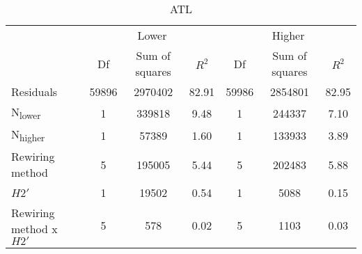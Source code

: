 \documentclass[12pt,a4paper]{article}
\begin{document}
\begin{table}
\medskip
    \begin{subtable}{\linewidth}
    \caption{ATL}
    \centering
\begin{tabularx}{\linewidth}{@{} X *6{c} @{}}
\toprule
  & \multicolumn{3}{c}{Lower} & \multicolumn{3}{c}{Higher} \\ \cmidrule(l){2-4} \cmidrule(l){5-7}
  						& Df		& Sum of squares	& $R^2$	& Df 	& Sum of squares	& $R^2$ \\ \midrule
Residuals 				& 59896 & 2970402		& 82.91	& 59986 & 2854801			& 82.95   \\
N\textsubscript{lower} 	& 1 		& 339818 		& 9.48 	& 1		& 244337 			& 7.10  \\
N\textsubscript{higher} 	& 1 		& 57389 			& 1.60	& 1 		& 133933 			& 3.89  \\
Rewiring method 			& 5 		& 195005 		& 5.44 	& 5 		& 202483			& 5.88  \\
$H2'$ 					& 1 		& 19502 			& 0.54 	& 1 		& 5088			& 0.15 \\
Rewiring method x $H2'$ 	& 5 		& 578 			& 0.02 	& 5 		& 1103			& 0.03  \\ \bottomrule
\end{tabularx}

\end{subtable}

\end{table}
\end{document}
